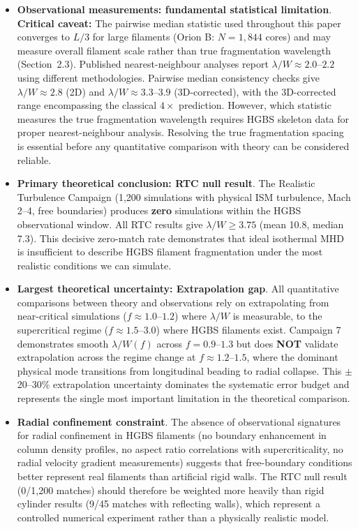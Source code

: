 \documentclass[twocolumn,longtitle,usenatbib]{mnras}
\begin{document}
\begin{itemize}
    \item \textbf{Observational measurements: fundamental statistical limitation}.
    \textbf{Critical caveat:} The pairwise median statistic used throughout this paper converges to $L/3$ for large filaments (Orion B: $N = 1,844$ cores) and may measure overall filament scale rather than true fragmentation wavelength (Section~2.3). Published nearest-neighbour analyses report $\lambda/W \approx 2.0$--$2.2$ using different methodologies. Pairwise median consistency checks give $\lambda/W \approx 2.8$ (2D) and $\lambda/W \approx 3.3$--$3.9$ (3D-corrected), with the 3D-corrected range encompassing the classical $4\times$ prediction. However, which statistic measures the true fragmentation wavelength requires HGBS skeleton data for proper nearest-neighbour analysis. Resolving the true fragmentation spacing is essential before any quantitative comparison with theory can be considered reliable.

    \item \textbf{Primary theoretical conclusion: RTC null result}. The Realistic Turbulence Campaign (1,200 simulations with physical ISM turbulence, Mach 2--4, free boundaries) produces \textbf{zero} simulations within the HGBS observational window. All RTC results give $\lambda/W \geq 3.75$ (mean 10.8, median 7.3). This decisive zero-match rate demonstrates that ideal isothermal MHD is insufficient to describe HGBS filament fragmentation under the most realistic conditions we can simulate.

    \item \textbf{Largest theoretical uncertainty: Extrapolation gap}. All quantitative comparisons between theory and observations rely on extrapolating from near-critical simulations ($f \approx 1.0$--$1.2$) where $\lambda/W$ is measurable, to the supercritical regime ($f \approx 1.5$--$3.0$) where HGBS filaments exist. Campaign 7 demonstrates smooth $\lambda/W(f)$ across $f = 0.9$--$1.3$ but does \textbf{NOT} validate extrapolation across the regime change at $f \approx 1.2$--$1.5$, where the dominant physical mode transitions from longitudinal beading to radial collapse. This $\pm$20--30\% extrapolation uncertainty dominates the systematic error budget and represents the single most important limitation in the theoretical comparison.

    \item \textbf{Radial confinement constraint}. The absence of observational signatures for radial confinement in HGBS filaments (no boundary enhancement in column density profiles, no aspect ratio correlations with supercriticality, no radial velocity gradient measurements) suggests that free-boundary conditions better represent real filaments than artificial rigid walls. The RTC null result (0/1,200 matches) should therefore be weighted more heavily than rigid cylinder results (9/45 matches with reflecting walls), which represent a controlled numerical experiment rather than a physically realistic model.


\end{itemize}
\end{document}
